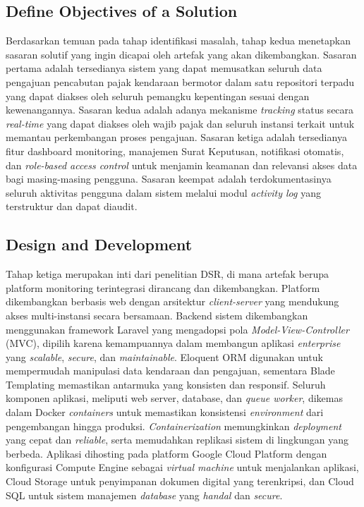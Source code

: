 \documentclass[conference]{IEEEtran}
\begin{document}
\subsection{Define Objectives of a Solution}
\label{subsec:define-objectives}

Berdasarkan temuan pada tahap identifikasi masalah, tahap kedua menetapkan sasaran
solutif yang ingin dicapai oleh artefak yang akan dikembangkan. Sasaran pertama
adalah tersedianya sistem yang dapat memusatkan seluruh data pengajuan pencabutan
pajak kendaraan bermotor dalam satu repositori terpadu yang dapat diakses oleh
seluruh pemangku kepentingan sesuai dengan kewenangannya. Sasaran kedua adalah
adanya mekanisme \emph{tracking} status secara \emph{real-time} yang dapat diakses
oleh wajib pajak dan seluruh instansi terkait untuk memantau perkembangan proses
pengajuan. Sasaran ketiga adalah tersedianya fitur dashboard monitoring, manajemen
Surat Keputusan, notifikasi otomatis, dan \emph{role-based access control} untuk
menjamin keamanan dan relevansi akses data bagi masing-masing pengguna. Sasaran
keempat adalah terdokumentasinya seluruh aktivitas pengguna dalam sistem melalui
modul \emph{activity log} yang terstruktur dan dapat diaudit.

\subsection{Design and Development}
\label{subsec:design-development}

Tahap ketiga merupakan inti dari penelitian DSR, di mana artefak berupa platform
monitoring terintegrasi dirancang dan dikembangkan. Platform dikembangkan berbasis
web dengan arsitektur \emph{client-server} yang mendukung akses multi-instansi
secara bersamaan. Backend sistem dikembangkan menggunakan framework Laravel yang
mengadopsi pola \emph{Model-View-Controller} (MVC), dipilih karena kemampuannya
dalam membangun aplikasi \emph{enterprise} yang \emph{scalable}, \emph{secure},
dan \emph{maintainable}. Eloquent ORM digunakan untuk mempermudah manipulasi data
kendaraan dan pengajuan, sementara Blade Templating memastikan antarmuka yang
konsisten dan responsif. Seluruh komponen aplikasi, meliputi web server, database,
dan \emph{queue worker}, dikemas dalam Docker \emph{containers} untuk memastikan
konsistensi \emph{environment} dari pengembangan hingga produksi.
\emph{Containerization} memungkinkan \emph{deployment} yang cepat dan
\emph{reliable}, serta memudahkan replikasi sistem di lingkungan yang berbeda.
Aplikasi dihosting pada platform Google Cloud Platform dengan konfigurasi Compute
Engine sebagai \emph{virtual machine} untuk menjalankan aplikasi, Cloud Storage
untuk penyimpanan dokumen digital yang terenkripsi, dan Cloud SQL untuk sistem
manajemen \emph{database} yang \emph{handal} dan \emph{secure}.
\end{document}
